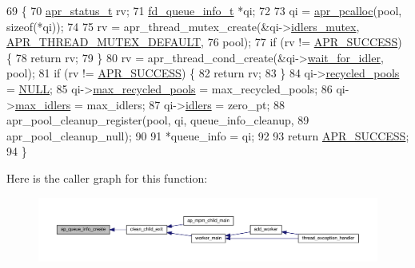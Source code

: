 \begin{DoxyCode}
69 \{
70     \hyperlink{group__apr__errno_gaa5105fa83cc322f09382292db8b47593}{apr\_status\_t} rv;
71     \hyperlink{structfd__queue__info__t}{fd\_queue\_info\_t} *qi;
72 
73     qi = \hyperlink{group__apr__pools_gad214fc0160de3c22b6435e29ea20fce8}{apr\_pcalloc}(pool, \textcolor{keyword}{sizeof}(*qi));
74 
75     rv = apr\_thread\_mutex\_create(&qi->\hyperlink{structfd__queue__info__t_a18d58b9d46ec7629daee1c309161b8d0}{idlers\_mutex}, 
      \hyperlink{group__apr__thread__mutex_ga579050872f9aff06e773b084264f7d06}{APR\_THREAD\_MUTEX\_DEFAULT},
76                                  pool);
77     \textcolor{keywordflow}{if} (rv != \hyperlink{group__apr__errno_ga9ee311b7bf1c691dc521d721339ee2a6}{APR\_SUCCESS}) \{
78         \textcolor{keywordflow}{return} rv;
79     \}
80     rv = apr\_thread\_cond\_create(&qi->\hyperlink{structfd__queue__info__t_ab55cf55999e66ef49df240ec7ac1b750}{wait\_for\_idler}, pool);
81     \textcolor{keywordflow}{if} (rv != \hyperlink{group__apr__errno_ga9ee311b7bf1c691dc521d721339ee2a6}{APR\_SUCCESS}) \{
82         \textcolor{keywordflow}{return} rv;
83     \}
84     qi->\hyperlink{structfd__queue__info__t_ac4e7511417ba04c774bf0576cba54dc2}{recycled\_pools} = \hyperlink{pcre_8txt_ad7f989d16aa8ca809a36bc392c07fba1}{NULL};
85     qi->\hyperlink{structfd__queue__info__t_ac83918a33f9efbcb3c79ca208358d5f3}{max\_recycled\_pools} = max\_recycled\_pools;
86     qi->\hyperlink{structfd__queue__info__t_a288e8b082895e4560c6414d9b77b773d}{max\_idlers} = max\_idlers;
87     qi->\hyperlink{structfd__queue__info__t_a34f88b2125fb629dd4200cf75568bb1d}{idlers} = zero\_pt;
88     apr\_pool\_cleanup\_register(pool, qi, queue\_info\_cleanup,
89                               apr\_pool\_cleanup\_null);
90 
91     *queue\_info = qi;
92 
93     \textcolor{keywordflow}{return} \hyperlink{group__apr__errno_ga9ee311b7bf1c691dc521d721339ee2a6}{APR\_SUCCESS};
94 \}
\end{DoxyCode}


Here is the caller graph for this function\+:
\nopagebreak
\begin{figure}[H]
\begin{center}
\leavevmode
\includegraphics[width=350pt]{group__APACHE__MPM__EVENT_ga4d0d706674f511d288505e01485464aa_icgraph}
\end{center}
\end{figure}


